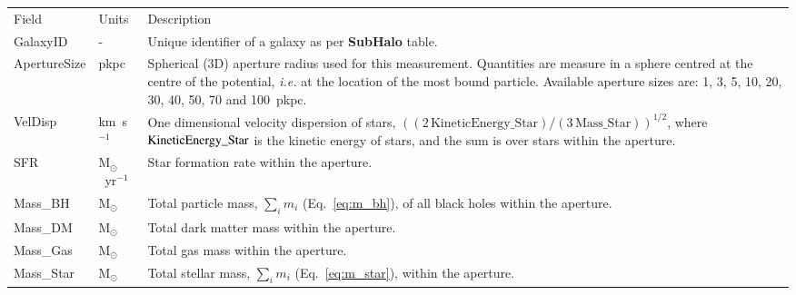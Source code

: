 \begin{table*}
\caption{Full listing of the content of the aperture table and description of
  the columns. These properties are contained in tables denoted {\bf
    [modelname]\_Aperture}. This table contains measurements within spherical
  apertures centred on the minimum of the gravitational potential of a given galaxy. Each row
  represents a set of measurements for a single galaxy using a single aperture
  size in physical kpc. The \GalaxyID column can be used to join this table to
  the corresponding {\bf [modelname]\_SubHalo} table.}
\label{table:aperture}

\begin{center}
\footnotesize

\renewcommand{\arraystretch}{1.5}
\begin{tabular}{ >{\ttfamily}p{4cm}p{1.5cm}p{11cm}}
{\large \bf Aperture} & & \\
\hline
\normalfont Field & Units & Description \\
\hline\hline

GalaxyID &
- &
Unique identifier of a galaxy as per {\bf SubHalo} table.\\

\hline

ApertureSize &
pkpc &	
Spherical (3D) aperture radius used for this measurement. Quantities are measure in a sphere centred at the centre of the potential, {\em i.e.} at the location of the most bound particle. Available aperture sizes are: 1, 3, 5, 10, 20, 30, 40, 50, 70 and 100~pkpc. \\

VelDisp &
km~s$^{-1}$ &
One dimensional velocity dispersion of stars, $((2\,\textrm{KineticEnergy\_Star})/(3\,\textrm{Mass\_Star}))^{1/2}$, where ${\rm KineticEnergy\_Star}$ is the kinetic energy of stars, and the sum is over stars within the aperture.\\

SFR &
M$_{\odot}$~yr$^{-1}$ &
Star formation rate within the aperture. \\

Mass\_BH &
M$_{\odot}$ &	
Total particle mass, $\sum_i m_i$ (Eq.~\ref{eq:m_bh}), of all black holes within the aperture. \\

Mass\_DM &
M$_{\odot}$ &	
Total dark matter mass within the aperture. \\

Mass\_Gas &
M$_{\odot}$ &	
Total gas mass within the aperture. \\

Mass\_Star &
M$_{\odot}$ &	
Total stellar mass, $\sum_i m_i$ (Eq.~\ref{eq:m_star}), within the aperture. \\

\hline
\end{tabular}
\end{center}
\end{table*}








